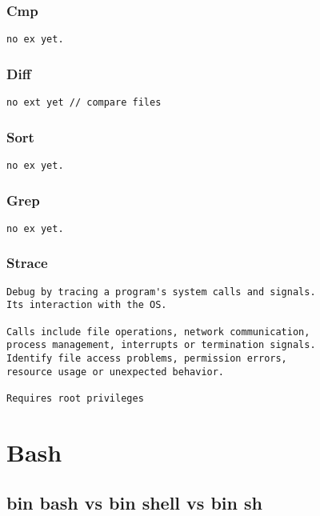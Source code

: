 \subsection{Cmp}

\begin{verbatim}
no ex yet.
\end{verbatim}

\subsection{Diff}

\begin{verbatim}
no ext yet // compare files
\end{verbatim}

\subsection{Sort}

\begin{verbatim}
no ex yet.
\end{verbatim}

\subsection{Grep}

\begin{verbatim}
no ex yet.
\end{verbatim}

\subsection{Strace}

\begin{verbatim}
Debug by tracing a program's system calls and signals.
Its interaction with the OS.

Calls include file operations, network communication,
process management, interrupts or termination signals.
Identify file access problems, permission errors,
resource usage or unexpected behavior. 

Requires root privileges
\end{verbatim}

\chapter{Bash}

\section{bin bash vs bin shell vs bin sh}

